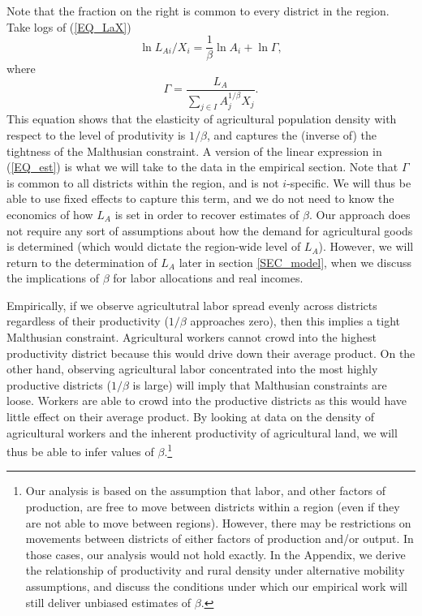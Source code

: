 \documentclass[11pt]{article}
\begin{document}
Note that the fraction on the right is common to every district in the region. Take logs of (\ref{EQ_LaX}) 
\begin{equation}
\ln L_{Ai}/X_i = \frac{1}{\beta} \ln A_{i} + \ln \Gamma, \label{EQ_est}
\end{equation}
where
\begin{equation}
    \Gamma = \frac{L_A}{\sum_{j\in I} A_{j}^{1/\beta}X_{j}}. \nonumber
\end{equation}
This equation shows that the elasticity of agricultural population density with respect to the level of produtivity is $1/\beta$, and captures the (inverse of) the tightness of the Malthusian constraint. A version of the linear expression in (\ref{EQ_est}) is what we will take to the data in the empirical section. Note that $\Gamma$ is common to all districts within the region, and is not $i$-specific. We will thus be able to use fixed effects to capture this term, and we do not need to know the economics of how $L_A$ is set in order to recover estimates of $\beta$. Our approach does not require any sort of assumptions about how the demand for agricultural goods is determined (which would dictate the region-wide level of $L_A$). However, we will return to the determination of $L_A$ later in section \ref{SEC_model}, when we discuss the implications of $\beta$ for labor allocations and real incomes.

Empirically, if we observe agricultutral labor spread evenly across districts regardless of their productivity ($1/\beta$ approaches zero), then this implies a tight Malthusian constraint. Agricultural workers cannot crowd into the highest productivity district because this would drive down their average product. On the other hand, observing agricultural labor concentrated into the most highly productive districts ($1/\beta$ is large) will imply that Malthusian constraints are loose. Workers are able to crowd into the productive districts as this would have little effect on their average product. By looking at data on the density of agricultural workers and the inherent productivity of agricultural land, we will thus be able to infer values of $\beta$.\footnote{Our analysis is based on the assumption that labor, and other factors of production, are free to move between districts within a region (even if they are not able to move between regions). However, there may be restrictions on movements between districts of either factors of production and/or output. In those cases, our analysis would not hold exactly. In the Appendix, we derive the relationship of productivity and rural density under alternative mobility assumptions, and discuss the conditions under which our empirical work will still deliver unbiased estimates of $\beta$.}
\end{document}
